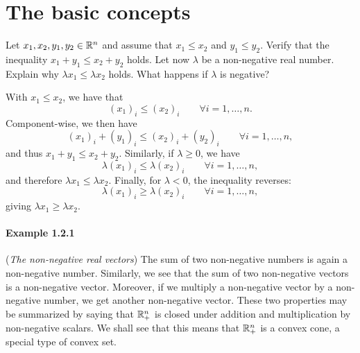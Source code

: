 \section{The basic concepts}

\begin{exercise}
  Let \( x_1, x_2, y_1, y_2 \in \mathbb{R}^n \) and assume that $x_1 \leq x_2$ and $y_1 \leq y_2$.
  Verify that the inequality $x_1 + y_1 \leq x_2 + y_2$ holds.
  Let now $\lambda$ be a non-negative real number.
  Explain why $\lambda x_1 \leq \lambda x_2$ holds.
  What happens if $\lambda$ is negative?
\end{exercise}

\begin{solution}
  With $x_1 \leq x_2$, we have that
  \begin{equation}
    (x_1)_i \leq (x_2)_i \qquad \forall i = 1, \ldots, n.
  \end{equation}
  Component-wise, we then have
  \begin{equation}
    (x_1)_i + (y_1)_i \leq (x_2)_i + (y_2)_i \qquad \forall i = 1, \ldots, n,
  \end{equation}
  and thus $x_1 + y_1 \leq x_2 + y_2$.
  Similarly, if $\lambda \geq 0$, we have
  \begin{equation}
    \lambda (x_1)_i \leq \lambda (x_2)_i \qquad \forall i = 1, \ldots, n,
  \end{equation}
  and therefore $\lambda x_1 \leq \lambda x_2$.
  Finally, for $\lambda < 0$, the inequality reverses:
  \begin{equation}
    \lambda (x_1)_i \geq \lambda (x_2)_i \qquad \forall i = 1, \ldots, n,
  \end{equation}
  giving $\lambda x_1 \geq \lambda x_2$.
\end{solution}

\paragraph{Example 1.2.1}
(\emph{The non-negative real vectors})
The sum of two non-negative numbers is again a non-negative number.
Similarly, we see that the sum of two non-negative vectors is a non-negative vector.
Moreover, if we multiply a non-negative vector by a non-negative number, we get another non-negative vector.
These two properties may be summarized by saying that $\mathbb{R}^n_+$ is closed under addition and multiplication by non-negative scalars.
We shall see that this means that $\mathbb{R}^n_+$ is a convex cone, a special type of convex set.

